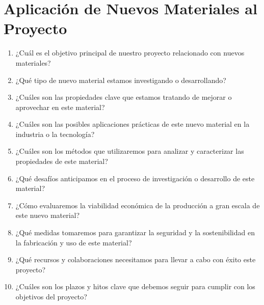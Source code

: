\documentclass[../main]{subfiles}
\begin{document}
\chapter{Aplicación de Nuevos Materiales al Proyecto}
\begin{enumerate}
  \item ¿Cuál es el objetivo principal de nuestro proyecto
    relacionado con nuevos materiales?
  \item ¿Qué tipo de nuevo material estamos investigando o desarrollando?
  \item ¿Cuáles son las propiedades clave que estamos tratando de
    mejorar o aprovechar en este material?
  \item ¿Cuáles son las posibles aplicaciones prácticas de este nuevo
    material en la industria o la tecnología?
  \item ¿Cuáles son los métodos que utilizaremos para analizar y
    caracterizar las propiedades de este material?
  \item ¿Qué desafíos anticipamos en el proceso de investigación o
    desarrollo de este material?
  \item ¿Cómo evaluaremos la viabilidad económica de la producción a
    gran escala de este nuevo material?
  \item ¿Qué medidas tomaremos para garantizar la seguridad y la
    sostenibilidad en la fabricación y uso de este material?
  \item ¿Qué recursos y colaboraciones necesitamos para llevar a cabo
    con éxito este proyecto?
  \item ¿Cuáles son los plazos y hitos clave que debemos seguir para
    cumplir con los objetivos del proyecto?
\end{enumerate}
\end{document}
